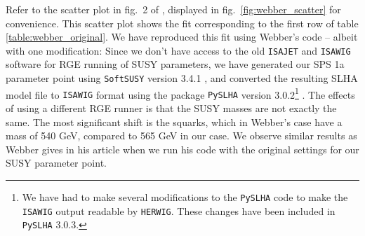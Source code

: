 \documentclass[twoside,english]{uiofysmaster}
\begin{document}
Refer to the scatter plot in fig.\ 2 of \cite{Webber:2009vm}, displayed in fig.\ \ref{fig:webber_scatter} for convenience. This scatter plot shows the fit corresponding to the first row of table \ref{table:webber_original}. We have reproduced this fit using Webber's code \cite{Webber:epost} -- albeit with one modification: Since we don't have access to the old {\tt ISAJET} and {\tt ISAWIG} software for RGE running of SUSY parameters, we have generated our SPS 1a parameter point using {\tt SoftSUSY} version 3.4.1 \cite{Allanach:2001kg}, and converted the resulting SLHA \cite{Skands:2003cj} model file to {\tt ISAWIG} format using the package {\tt PySLHA} version 3.0.2\footnote{We have had to make several modifications to the {\tt PySLHA} code to make the {\tt ISAWIG} output readable by {\tt HERWIG}. These changes have been included in {\tt PySLHA} 3.0.3.} \cite{Buckley:2013jua}. The effects of using a different RGE runner is that the SUSY masses are not exactly the same. The most significant shift is the squarks, which in Webber's case have a mass of 540 GeV, compared to 565 GeV in our case. We observe similar results as Webber gives in his article when we run his code with the original settings for our SUSY parameter point. 
\end{document}
